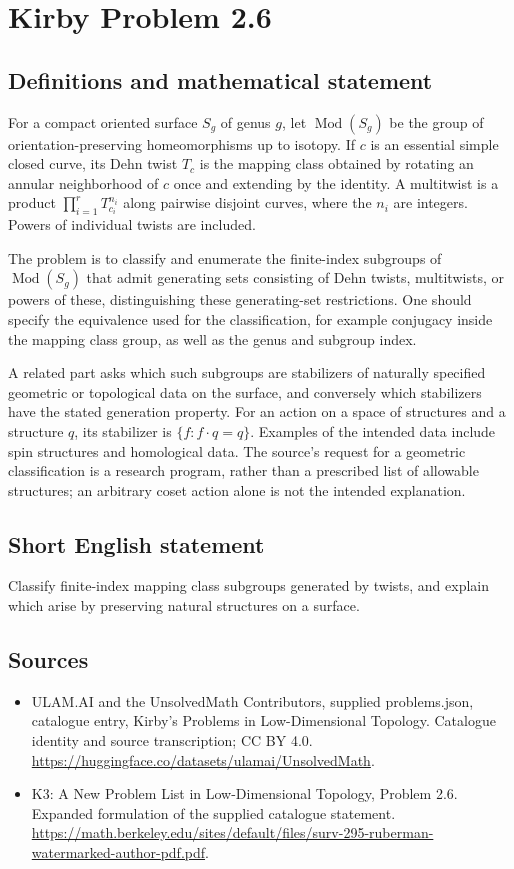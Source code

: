 \documentclass[11pt,a4paper]{article}
\begin{document}
\section*{Kirby Problem 2.6}\label{statement}

\subsection{Definitions and mathematical statement}
For a compact oriented surface $S_g$ of genus $g$, let $\operatorname{Mod}(S_g)$
be the group of orientation-preserving homeomorphisms up to isotopy. If $c$ is an
essential simple closed curve, its Dehn twist $T_c$ is the mapping class obtained
by rotating an annular neighborhood of $c$ once and extending by the identity.
A multitwist is a product $\prod_{i=1}^r T_{c_i}^{n_i}$ along pairwise disjoint
curves, where the $n_i$ are integers. Powers of individual twists are included.

The problem is to classify and enumerate the finite-index subgroups of
$\operatorname{Mod}(S_g)$ that admit generating sets consisting of Dehn twists,
multitwists, or powers of these, distinguishing these generating-set restrictions.
One should specify the equivalence used for the classification, for example
conjugacy inside the mapping class group, as well as the genus and subgroup index.

A related part asks which such subgroups are stabilizers of naturally specified
geometric or topological data on the surface, and conversely which stabilizers
have the stated generation property. For an action on a space of structures and
a structure $q$, its stabilizer is $\{f:f\cdot q=q\}$. Examples of the intended
data include spin structures and homological data. The source's request for a
geometric classification is a research program, rather than a prescribed list of
allowable structures; an arbitrary coset action alone is not the intended explanation.
\subsection{Short English statement}
Classify finite-index mapping class subgroups generated by twists, and explain which arise by preserving natural structures on a surface.
\subsection{Sources}
\begin{itemize}
\item[S1] ULAM.AI and the UnsolvedMath Contributors, supplied problems.json, catalogue entry, Kirby's Problems in Low-Dimensional Topology. Catalogue identity and source transcription; CC BY 4.0.
\url{https://huggingface.co/datasets/ulamai/UnsolvedMath}.
\item[S2] K3: A New Problem List in Low-Dimensional Topology, Problem 2.6. Expanded formulation of the supplied catalogue statement.
\url{https://math.berkeley.edu/sites/default/files/surv-295-ruberman-watermarked-author-pdf.pdf}.
\end{itemize}
\end{document}
